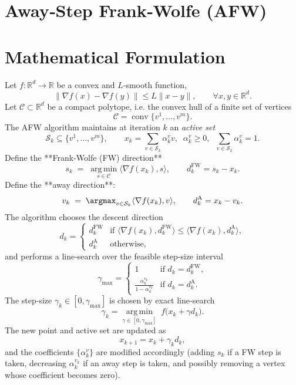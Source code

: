 \documentclass{article}
\newcommand{\R}{\mathbb{R}}
\newcommand{\C}{\mathcal{C}}
\newcommand{\conv}{\operatorname{conv}}
\newcommand{\argmin}{\operatorname*{arg\,min}}
\begin{document}
\section*{Away‑Step Frank‑Wolfe (AFW)}

\section*{Mathematical Formulation}
Let $f:\R^{d}\to\R$ be a convex and $L$‑smooth function,
\[
\|\nabla f(x)-\nabla f(y)\|\le L\|x-y\|,\qquad\forall x,y\in\R^{d}.
\]
Let $\C\subset\R^{d}$ be a compact polytope, i.e. the convex hull of a finite set of vertices
\[
\C=\conv\{v^{1},\dots ,v^{m}\}.
\]
The AFW algorithm maintains at iteration $k$ an \emph{active set}
\[
\mathcal{S}_{k}\subseteq\{v^{1},\dots ,v^{m}\},\qquad 
x_{k}=\sum_{v\in\mathcal{S}_{k}}\alpha_{k}^{v}v,\;\;\alpha_{k}^{v}\ge0,\;\;\sum_{v\in\mathcal{S}_{k}}\alpha_{k}^{v}=1.
\]
Define the **Frank‑Wolfe (FW) direction**
\[
s_{k} \;=\;\argmin_{s\in\C}\langle \nabla f(x_{k}),s\rangle,
\qquad
d^{\text{FW}}_{k}=s_{k}-x_{k}.
\]
Define the **away direction**:
\[
v_{k}\;=\;\argmax_{v\in\mathcal{S}_{k}}\langle \nabla f(x_{k}),v\rangle,
\qquad
d^{\text{A}}_{k}=x_{k}-v_{k}.
\]
The algorithm chooses the descent direction
\[
d_{k}= 
\begin{cases}
d^{\text{FW}}_{k} & \text{if }\langle \nabla f(x_{k}),d^{\text{FW}}_{k}\rangle\le 
\langle \nabla f(x_{k}),d^{\text{A}}_{k}\rangle,\\[4pt]
d^{\text{A}}_{k} & \text{otherwise},
\end{cases}
\]
and performs a line‑search over the feasible step‑size interval
\[
\gamma_{\max}=
\begin{cases}
1 & \text{if }d_{k}=d^{\text{FW}}_{k},\\[4pt]
\displaystyle\frac{\alpha_{k}^{v_{k}}}{1-\alpha_{k}^{v_{k}}} & \text{if }d_{k}=d^{\text{A}}_{k}.
\end{cases}
\]
The step‑size $\gamma_{k}\in[0,\gamma_{\max}]$ is chosen by exact line‑search
\[
\gamma_{k}= \argmin_{\gamma\in[0,\gamma_{\max}]}\; f\bigl(x_{k}+\gamma d_{k}\bigr).
\]
The new point and active set are updated as
\[
x_{k+1}=x_{k}+\gamma_{k}d_{k},
\]
and the coefficients $\{\alpha_{k}^{v}\}$ are modified accordingly (adding $s_{k}$ if a FW step is taken, decreasing $\alpha_{k}^{v_{k}}$ if an away step is taken, and possibly removing a vertex whose coefficient becomes zero).
\end{document}

